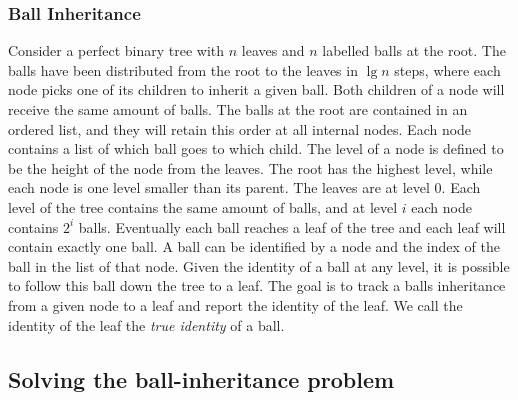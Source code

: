 

\subsubsection{Ball Inheritance}
Consider a perfect binary tree with $n$ leaves and $n$ labelled balls at the root. The balls have been distributed from the root to the leaves in $\lg n$ steps, where each node picks one of its children to inherit a given ball. Both children of a node will receive the same amount of balls. The balls at the root are contained in an ordered list, and they will retain this order at all internal nodes. Each node contains a list of which ball goes to which child. The level of a node is defined to be the height of the node from the leaves. The root has the highest level, while each node is one level smaller than its parent. The leaves are at level $0$. Each level of the tree contains the same amount of balls, and at level $i$ each node contains $2^i$ balls. Eventually each ball reaches a leaf of the tree and each leaf will contain exactly one ball. A ball can be identified by a node and the index of the ball in the list of that node. Given the identity of a ball at any level, it is possible to follow this ball down the tree to a leaf. The goal is to track a balls inheritance from a given node to a leaf and report the identity of the leaf. We call the identity of the leaf the \emph{true identity} of a ball. 


\subsection{Solving the ball-inheritance problem} 
\label{ssection:solving-ball}

